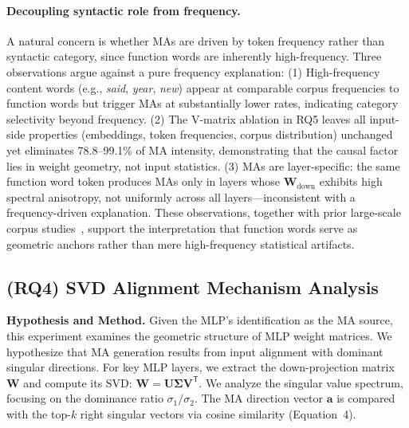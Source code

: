 \documentclass[conference]{IEEEtran}
\begin{document}
\vspace{0.5em}
\noindent{}
\vspace{0.5em}

\paragraph{Decoupling syntactic role from frequency.} A natural concern is whether MAs are driven by token frequency rather than syntactic category, since function words are inherently high-frequency. Three observations argue against a pure frequency explanation: (1) High-frequency content words (e.g., \textit{said}, \textit{year}, \textit{new}) appear at comparable corpus frequencies to function words but trigger MAs at substantially lower rates, indicating category selectivity beyond frequency. (2) The V-matrix ablation in RQ5 leaves all input-side properties (embeddings, token frequencies, corpus distribution) unchanged yet eliminates 78.8--99.1\% of MA intensity, demonstrating that the causal factor lies in weight geometry, not input statistics. (3) MAs are layer-specific: the same function word token produces MAs only in layers whose $\mathbf{W}_{\text{down}}$ exhibits high spectral anisotropy, not uniformly across all layers---inconsistent with a frequency-driven explanation. These observations, together with prior large-scale corpus studies~\cite{dao2024massive}, support the interpretation that function words serve as geometric anchors rather than mere high-frequency statistical artifacts.

\subsection{(RQ4) SVD Alignment Mechanism Analysis}
\label{sec:RQ4}

\noindent\textbf{Hypothesis and Method.}
Given the MLP's identification as the MA source, this experiment examines the geometric structure of MLP weight matrices. We hypothesize that MA generation results from input alignment with dominant singular directions. For key MLP layers, we extract the down-projection matrix $\mathbf{W}$ and compute its SVD: $\mathbf{W} = \mathbf{U}\boldsymbol{\Sigma}\mathbf{V}^{\mathsf{T}}$. We analyze the singular value spectrum, focusing on the dominance ratio $\sigma_1/\sigma_2$. The MA direction vector $\mathbf{a}$ is compared with the top-$k$ right singular vectors via cosine similarity (Equation~4).
\end{document}
